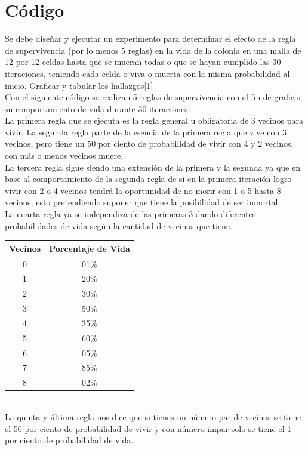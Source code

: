\documentclass{article}
\begin{document}
\section{Código}
Se debe diseñar y ejecutar un experimento para determinar el efecto de la regla de supervivencia (por lo menos 5 reglas) en la vida de la colonia en una malla de 12 por 12 celdas hasta que se mueran todas o que se hayan cumplido las 30 iteraciones, teniendo cada celda o viva o muerta con la misma probabilidad al inicio. Graficar y tabular los hallazgos[1]\\
Con el siguiente código se realizan 5 reglas de supervivencia con el fin de graficar su comportamiento de vida durante 30 iteraciones.\\
La primera regla que se ejecuta es la regla general u obligatoria de 3 vecinos para vivir. La segunda regla parte de la esencia de la primera regla que vive con 3 vecinos, pero tiene un 50 por ciento de probabilidad de vivir con 4 y 2 vecinos, con más o menos vecinos muere.\\
La tercera regla sigue siendo una extensión de la primera y la segunda ya que en base al comportamiento de la segunda regla de si en la primera iteración logro vivir con 2 o 4 vecinos tendrá la oportunidad de no morir con 1 o 5 hasta 8 vecinos, esto pretendiendo suponer que tiene la posibilidad de ser inmortal.
\\

La cuarta regla ya se independiza de las primeras 3 dando diferentes probabilidades de vida según la cantidad de vecinos que tiene.\\


 \begin{tabular}{||c c ||} 
 \hline
 Vecinos & Porcentaje de Vida  \\ [0.5ex] 
 \hline\hline
 0 & 01\% \\
 \hline
 1 & 20\% \\ 
 \hline
 2 & 30\%  \\
 \hline
 3 & 50\% \\
 \hline
 4 & 35\% \\
 \hline
 5 & 60\% \\ [1ex] 
 \hline
 6 & 05\% \\
 \hline
 7 & 85\% \\
 \hline
 8 & 02\% \\
 \hline
\end{tabular}
\\

La quinta y última regla nos dice que si tienes un número par de vecinos se tiene el 50 por ciento de probabilidad de vivir y con número impar solo se tiene el 1 por ciento de probabilidad de vida.
\end{document}
